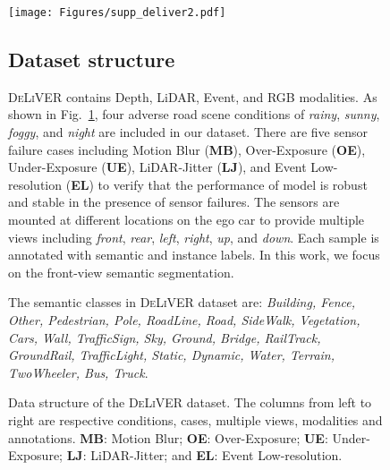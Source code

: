 \documentclass[10pt,twocolumn,letterpaper]{article}
\begin{document}
\begin{figure}[!t]
{\begin{figure*}
    \centering
    \texttt{[image: Figures/supp\_deliver2.pdf]}
\caption{Data structure of the \textsc{DeLiVER} dataset. The columns from left to right are respective conditions, cases, multiple views, modalities and annotations. \textbf{MB}: Motion Blur; \textbf{OE}: Over-Exposure; \textbf{UE}: Under-Exposure; \textbf{LJ}: LiDAR-Jitter; and \textbf{EL}: Event Low-resolution.}
    \label{fig:deliver_struc}
\end{figure*}
\subsection{Dataset structure}
\textsc{DeLiVER} contains Depth, LiDAR, Event, and RGB modalities.
As shown in Fig.~\ref{fig:deliver_struc}, four adverse road scene conditions of \emph{rainy}, \emph{sunny}, \emph{foggy}, and \emph{night} are included in our dataset.
There are five sensor failure cases including Motion Blur (\textbf{MB}), Over-Exposure (\textbf{OE}), Under-Exposure (\textbf{UE}), LiDAR-Jitter (\textbf{LJ}), and Event Low-resolution (\textbf{EL}) to verify that the performance of model is robust and stable in the presence of sensor failures. The sensors are mounted at different locations on the ego car to provide multiple views including \emph{front}, \emph{rear}, \emph{left}, \emph{right}, \emph{up}, and \emph{down}. Each sample is annotated with semantic and instance labels. In this work, we focus on the front-view semantic segmentation.

The  semantic classes in \textsc{DeLiVER} dataset are: \emph{Building, Fence, Other, Pedestrian, Pole, RoadLine, Road, SideWalk, Vegetation, Cars, Wall, TrafficSign, Sky, Ground, Bridge, RailTrack, GroundRail, TrafficLight, Static, Dynamic, Water, Terrain, TwoWheeler, Bus, Truck}.

}
\end{figure}
\end{document}
